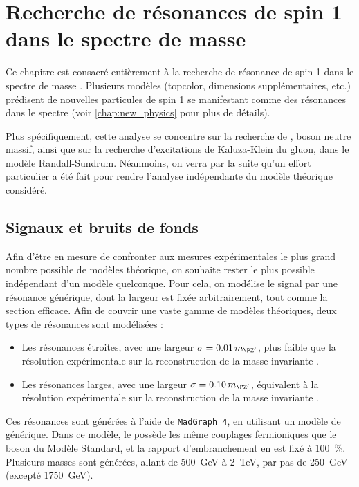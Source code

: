 \chapter{Recherche de résonances de spin 1 dans le spectre de masse \ttbar} \label{chap:zprime}

Ce chapitre est consacré entièrement à la recherche de résonance de spin 1 dans le spectre de masse \ttbar. Plusieurs modèles (topcolor, dimensions supplémentaires, etc.) prédisent de nouvelles particules de spin 1 se manifestant comme des résonances dans le spectre \mtt (voir \cref{chap:new_physics} pour plus de détails).

\bigskip

Plus spécifiquement, cette analyse se concentre sur la recherche de \zprime, boson neutre massif, ainsi que sur la recherche d'excitations de Kaluza-Klein du gluon, dans le modèle Randall-Sundrum. Néanmoins, on verra par la suite qu'un effort particulier a été fait pour rendre l'analyse indépendante du modèle théorique considéré.

\section{Signaux et bruits de fonds}

Afin d'être en mesure de confronter aux mesures expérimentales le plus grand nombre possible de modèles théorique, on souhaite rester le plus possible indépendant d'un modèle quelconque. Pour cela, on modélise le signal par une résonance générique, dont la largeur est fixée arbitrairement, tout comme la section efficace. Afin de couvrir une vaste gamme de modèles théoriques, deux types de résonances sont modélisées :
\begin{itemize}
    \item Les résonances étroites, avec une largeur $\sigma = \num{0.01} \, \mzp$, plus faible que la résolution expérimentale sur la reconstruction de la masse invariante \ttbar.
    \item Les résonances larges, avec une largeur $\sigma = \num{0.10} \, \mzp$, équivalent à la résolution expérimentale sur la reconstruction de la masse invariante \ttbar.
\end{itemize}

Ces résonances sont générées à l'aide de \texttt{MadGraph 4}, en utilisant un modèle de \zprime générique. Dans ce modèle, le \zprime possède les même couplages fermioniques que le boson \PZ du Modèle Standard, et la rapport d'embranchement en \ttbar est fixé à \SI{100}{\%}. Plusieurs masses sont générées, allant de \SI{500}{\GeV} à \SI{2}{\TeV}, par pas de \SI{250}{\GeV} (excepté \SI{1750}{\GeV}).

